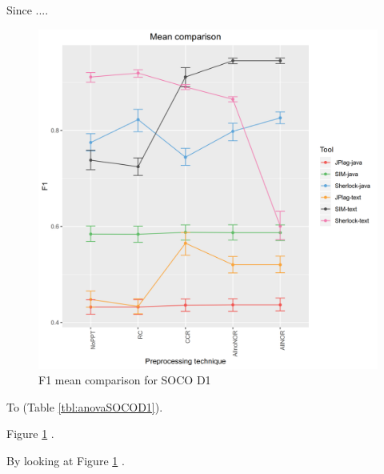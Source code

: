 \documentclass[a4paper, 12pt, oneside, openany, final, pdftex]{book}\usepackage[]{graphicx}\usepackage[]{color}
\makeatletter
\def\maxwidth{ %
  \ifdim\Gin@nat@width>\linewidth
    \linewidth
  \else
    \Gin@nat@width
  \fi
}
\makeatother
\begin{document}
Since ....

\begin{figure}
	\centering 

\includegraphics[width=\maxwidth]{figure/FigureMeanComparisonGraphSOCOD1-1} 

	\caption{F1 mean comparison for SOCO D1}\label{fig:meanComparisonSOCOD1}
\end{figure}

To (Table \ref{tbl:anovaSOCOD1}).

Figure \ref{fig:meanComparisonSOCOD1} .

By looking at Figure \ref{fig:meanComparisonSOCOD1} .
\end{document}
